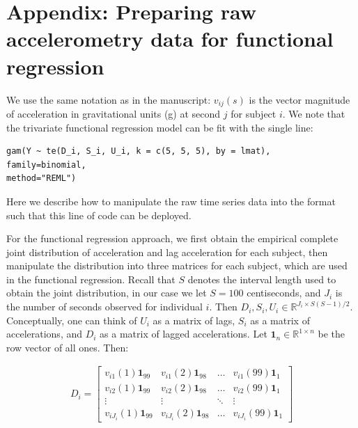 \clearpage

\section{Appendix: Preparing raw accelerometry data for functional regression}\label{appx1}

\noindent We use the same notation as in the manuscript: $v_{ij}(s)$ is the vector magnitude of acceleration in gravitational units (g) at second $j$ for subject $i$. We note that the trivariate functional regression model can be fit with the single line: 

\begin{verbatim}
gam(Y ~ te(D_i, S_i, U_i, k = c(5, 5, 5), by = lmat),
family=binomial, 
method="REML")
\end{verbatim}

\noindent Here we describe how to manipulate the raw time series data into the format such that this line of code can be deployed.



 \bigskip 
 
For the functional regression approach, we first obtain the empirical complete joint distribution of acceleration and lag acceleration for each subject, then manipulate the distribution into three matrices for each subject, which are used in the functional regression. Recall that $S$ denotes the interval length used to obtain the joint distribution, in our case we let $S = 100$ centiseconds, and $J_i$ is the number of seconds observed for individual $i$. Then $\mathit{D}_i, \mathit{S}_i, \mathit{U}_i \in \mathbb{R}^{J_i\times S(S-1)/2}$. Conceptually, one can think of $\mathit{U}_i$ as a matrix of lags, $\mathit{S}_i$ as a matrix of accelerations, and $\mathit{D}_i$ as a matrix of lagged accelerations. 
Let $\mathbf{1}_n \in \mathbb{R}^{1\times n}$ be the row vector of all ones. Then:

\begin{align*}
   \mathit{D}_i = 
   \begin{bmatrix}
   v_{i1}(1) \mathbf{1}_{99} &  v_{i1}(2) \mathbf{1}_{98} &\dots &  v_{i1}(99) \mathbf{1}_{1}  \\
    v_{i2}(1) \mathbf{1}_{99} &  v_{i2}(2) \mathbf{1}_{98} &\dots &  v_{i2}(99) \mathbf{1}_{1}  \\
    \vdots & \vdots & \ddots &\vdots \\
    v_{iJ_i}(1) \mathbf{1}_{99} &  v_{iJ_i}(2) \mathbf{1}_{98} &\dots &  v_{iJ_i}(99) \mathbf{1}_{1} 
    \end{bmatrix}
\end{align*}

